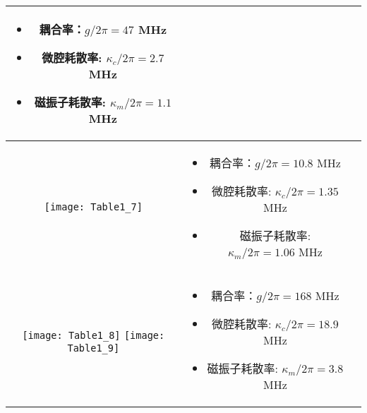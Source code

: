 \begin{center}
\begin{tabular}{ccc}
\begin{minipage}[m]{.5\textwidth}
			\begin{itemize}
				\item 耦合率：$g/2\pi=47$ MHz
				\item 微腔耗散率: $\kappa_c /2\pi=2.7$ MHz
				\item 磁振子耗散率: $\kappa_m /2\pi=1.1$ MHz
			\end{itemize}
		\end{minipage} &
		\parencite{PhysRevLett.113.083603Nakamura} \\
		\hline
		\begin{minipage}[m]{.3\textwidth}\centering\vspace*{5pt}
			\texttt{[image: Table1\_7]}\vspace*{5pt}
		\end{minipage} &
		\begin{minipage}[m]{.5\textwidth}
			\begin{itemize}
				\item 耦合率：$g/2\pi=10.8$ MHz
				\item 微腔耗散率: $\kappa_c /2\pi=1.35$ MHz
				\item 磁振子耗散率: $\kappa_m /2\pi=1.06$ MHz
			\end{itemize}
		\end{minipage} &
		\parencite{PhysRevLett.113.156401Tang} \\
		\hline
		\begin{minipage}[m]{.3\textwidth}\centering\vspace*{5pt}
			\texttt{[image: Table1\_8]}
			\texttt{[image: Table1\_9]}\vspace*{5pt}
		\end{minipage} &
		\begin{minipage}[m]{.5\textwidth}
			\begin{itemize}
				\item 耦合率：$g/2\pi=168$ MHz
				\item 微腔耗散率: $\kappa_c /2\pi=18.9$ MHz
				\item 磁振子耗散率: $\kappa_m /2\pi=3.8$ MHz
			\end{itemize}
		\end{minipage} &
		\parencite{PhysRevLett.114.227201Hu} \\
		\bottomrule
	\end{tabular}
\end{center}
